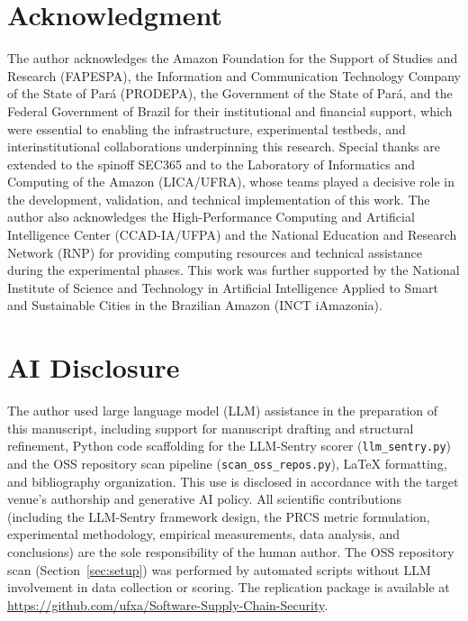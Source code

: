 \documentclass[conference]{IEEEtran}
\begin{document}
\section*{Acknowledgment}

The author acknowledges the Amazon Foundation for the Support of Studies and Research (FAPESPA), the Information and Communication Technology Company of the State of Par\'{a} (PRODEPA), the Government of the State of Par\'{a}, and the Federal Government of Brazil for their institutional and financial support, which were essential to enabling the infrastructure, experimental testbeds, and interinstitutional collaborations underpinning this research. Special thanks are extended to the spinoff SEC365 and to the Laboratory of Informatics and Computing of the Amazon (LICA/UFRA), whose teams played a decisive role in the development, validation, and technical implementation of this work. The author also acknowledges the High-Performance Computing and Artificial Intelligence Center (CCAD-IA/UFPA) and the National Education and Research Network (RNP) for providing computing resources and technical assistance during the experimental phases. This work was further supported by the National Institute of Science and Technology in Artificial Intelligence Applied to Smart and Sustainable Cities in the Brazilian Amazon (INCT iAmazonia).

\section*{AI Disclosure}

The author used large language model (LLM) assistance in the preparation of this manuscript, including support for manuscript drafting and structural refinement, Python code scaffolding for the LLM-Sentry scorer (\texttt{llm\_sentry.py}) and the OSS repository scan pipeline (\texttt{scan\_oss\_repos.py}), \LaTeX{} formatting, and bibliography organization. This use is disclosed in accordance with the target venue's authorship and generative AI policy. All scientific contributions (including the LLM-Sentry framework design, the PRCS metric formulation, experimental methodology, empirical measurements, data analysis, and conclusions) are the sole responsibility of the human author. The OSS repository scan (Section~\ref{sec:setup}) was performed by automated scripts without LLM involvement in data collection or scoring. The replication package is available at \url{https://github.com/ufxa/Software-Supply-Chain-Security}.



\end{document}

